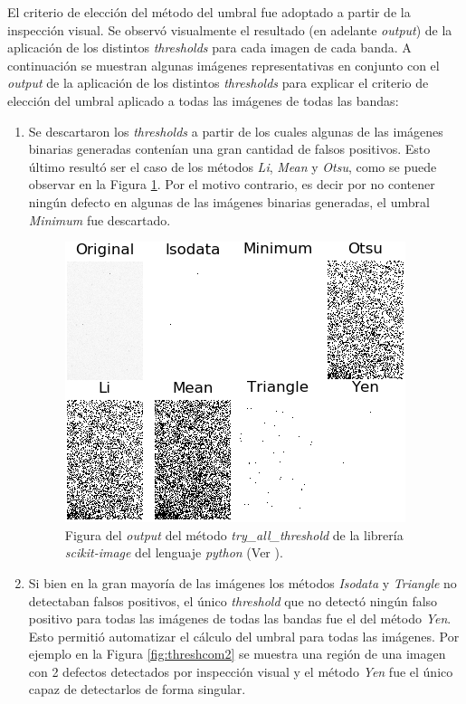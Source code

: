 El criterio de elección del método del umbral fue adoptado a partir de la inspección visual. Se observó visualmente el resultado (en adelante \textit{output}) de la aplicación de los distintos \textit{thresholds} para cada imagen de cada banda. A continuación se muestran algunas imágenes representativas en conjunto con el \textit{output} de la aplicación de los distintos \textit{thresholds} para explicar el criterio de elección del umbral aplicado a todas las imágenes de todas las bandas:
\begin{enumerate}
\justifying
\item Se descartaron los \textit{thresholds} a partir de los cuales algunas de las imágenes binarias generadas contenían una gran cantidad de falsos positivos. Esto último resultó ser el caso de los métodos \textit{Li}\cite{Lie}, \textit{Mean}\cite{Glasmean} y \textit{Otsu}\cite{otsuu}, como se puede observar en la Figura \ref{fig:threshcom}. Por el motivo contrario, es decir por no contener ningún defecto en algunas de las imágenes binarias generadas, el umbral \textit{Minimum}\cite{pericles} fue descartado.
\begin{figure}[H]
	\centering
	\includegraphics[scale=1.5]{Figs/defectosZEISS/thresh_comparison.png}
	\caption{Figura del \textit{output} del método \textit{try\_all\_threshold} de la librería \textit{scikit-image} del lenguaje \textit{python} (Ver \href{https://github.com/jrr1984/defects_analysis/blob/master/try_all_thresholds.py}{\faGithub}).} 
	\label{fig:threshcom}
\end{figure}

\item Si bien en la gran mayoría de las imágenes los métodos \textit{Isodata}\cite{ridler} y \textit{Triangle}\cite{triang} no detectaban falsos positivos, el único \textit{threshold} que no detectó ningún falso positivo para todas las imágenes de todas las bandas fue el del método \textit{Yen}. Esto permitió automatizar el cálculo del umbral para todas las imágenes. Por ejemplo en la Figura \ref{fig:threshcom2} se muestra una región de una imagen con 2 defectos detectados por inspección visual y el método \textit{Yen} fue el único capaz de detectarlos de forma singular.


\end{enumerate}
